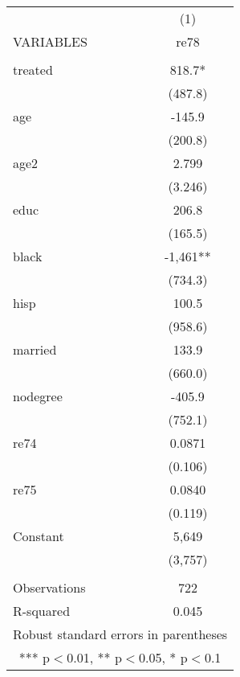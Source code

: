 \documentclass[]{article}
\begin{document}
\begin{tabular}{lc} \hline
 & (1) \\
VARIABLES & re78 \\ \hline
 &  \\
treated & 818.7* \\
 & (487.8) \\
age & -145.9 \\
 & (200.8) \\
age2 & 2.799 \\
 & (3.246) \\
educ & 206.8 \\
 & (165.5) \\
black & -1,461** \\
 & (734.3) \\
hisp & 100.5 \\
 & (958.6) \\
married & 133.9 \\
 & (660.0) \\
nodegree & -405.9 \\
 & (752.1) \\
re74 & 0.0871 \\
 & (0.106) \\
re75 & 0.0840 \\
 & (0.119) \\
Constant & 5,649 \\
 & (3,757) \\
 &  \\
Observations & 722 \\
 R-squared & 0.045 \\ \hline
\multicolumn{2}{c}{ Robust standard errors in parentheses} \\
\multicolumn{2}{c}{ *** p$<$0.01, ** p$<$0.05, * p$<$0.1} \\
\end{tabular}
\end{document}
